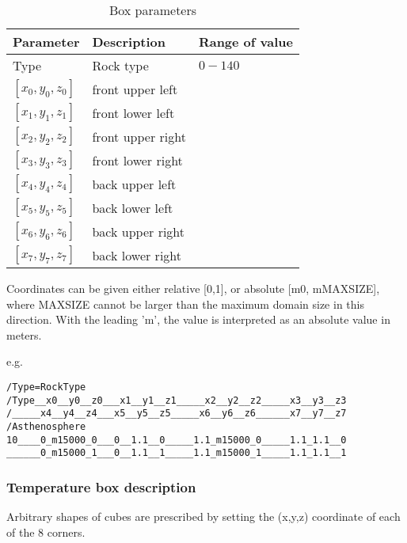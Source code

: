 \begin{table}[H]
\centering
\begin{tabular}{l l l}
\toprule
Parameter		& Description			& Range of value \\
\midrule
Type			& Rock type				& $0-140$\\
$[x_0,y_0,z_0]$ & front upper left\\ 
$[x_1,y_1,z_1]$ & front lower left \\  
$[x_2,y_2,z_2]$ & front upper right \\ 
$[x_3,y_3,z_3]$ & front lower right \\ 
$[x_4,y_4,z_4]$ & back upper left \\  
$[x_5,y_5,z_5]$ & back lower left \\ 
$[x_6,y_6,z_6]$ & back upper right \\  
$[x_7,y_7,z_7]$ & back lower right \\ 
\bottomrule
\end{tabular}
\caption{Box parameters}
\label{tbl:box_parameters}
\end{table}

Coordinates can be given either relative [0,1], or absolute [m0, mMAXSIZE], where MAXSIZE cannot be larger than the maximum domain size in this direction. With the leading 'm', the value is interpreted as an absolute value in meters.

e.g.
\begin{lstlisting}
/Type=RockType
/Type__x0__y0__z0___x1__y1__z1_____x2__y2__z2_____x3__y3__z3
/_____x4__y4__z4___x5__y5__z5_____x6__y6__z6______x7__y7__z7
/Asthenosphere
10____0_m15000_0___0__1.1__0_____1.1_m15000_0_____1.1_1.1__0
______0_m15000_1___0__1.1__1_____1.1_m15000_1_____1.1_1.1__1
\end{lstlisting}

\subsubsection{Temperature box description}
Arbitrary shapes of cubes are prescribed by setting the (x,y,z) coordinate of each of the 8 corners.

